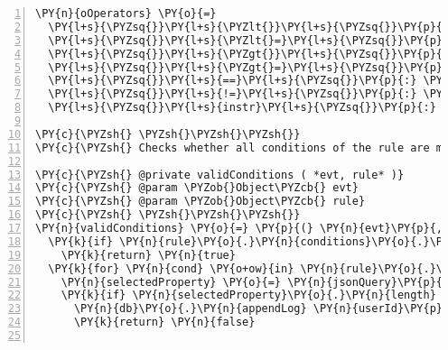 \begin{Verbatim}[fontsize=\scriptsize,commandchars=\\\{\},numbers=left,firstnumber=1,stepnumber=1]
\PY{n}{oOperators} \PY{o}{=}
  \PY{l+s}{\PYZsq{}}\PY{l+s}{\PYZlt{}}\PY{l+s}{\PYZsq{}}\PY{p}{:} \PY{p}{(} \PY{n}{x}\PY{p}{,} \PY{n}{y} \PY{p}{)} \PY{o}{\PYZhy{}}\PY{o}{\PYZgt{}} \PY{n}{x} \PY{o}{\PYZlt{}} \PY{n}{y}
  \PY{l+s}{\PYZsq{}}\PY{l+s}{\PYZlt{}=}\PY{l+s}{\PYZsq{}}\PY{p}{:} \PY{p}{(} \PY{n}{x}\PY{p}{,} \PY{n}{y} \PY{p}{)} \PY{o}{\PYZhy{}}\PY{o}{\PYZgt{}} \PY{n}{x} \PY{o}{\PYZlt{}}\PY{o}{=} \PY{n}{y}
  \PY{l+s}{\PYZsq{}}\PY{l+s}{\PYZgt{}}\PY{l+s}{\PYZsq{}}\PY{p}{:} \PY{p}{(} \PY{n}{x}\PY{p}{,} \PY{n}{y} \PY{p}{)} \PY{o}{\PYZhy{}}\PY{o}{\PYZgt{}} \PY{n}{x} \PY{o}{\PYZgt{}} \PY{n}{y}
  \PY{l+s}{\PYZsq{}}\PY{l+s}{\PYZgt{}=}\PY{l+s}{\PYZsq{}}\PY{p}{:} \PY{p}{(} \PY{n}{x}\PY{p}{,} \PY{n}{y} \PY{p}{)} \PY{o}{\PYZhy{}}\PY{o}{\PYZgt{}} \PY{n}{x} \PY{o}{\PYZgt{}}\PY{o}{=} \PY{n}{y}
  \PY{l+s}{\PYZsq{}}\PY{l+s}{==}\PY{l+s}{\PYZsq{}}\PY{p}{:} \PY{p}{(} \PY{n}{x}\PY{p}{,} \PY{n}{y} \PY{p}{)} \PY{o}{\PYZhy{}}\PY{o}{\PYZgt{}} \PY{n}{x} \PY{o+ow}{is} \PY{n}{y}
  \PY{l+s}{\PYZsq{}}\PY{l+s}{!=}\PY{l+s}{\PYZsq{}}\PY{p}{:} \PY{p}{(} \PY{n}{x}\PY{p}{,} \PY{n}{y} \PY{p}{)} \PY{o}{\PYZhy{}}\PY{o}{\PYZgt{}} \PY{n}{x} \PY{n}{isnt} \PY{n}{y}
  \PY{l+s}{\PYZsq{}}\PY{l+s}{instr}\PY{l+s}{\PYZsq{}}\PY{p}{:} \PY{p}{(} \PY{n}{x}\PY{p}{,} \PY{n}{y} \PY{p}{)} \PY{o}{\PYZhy{}}\PY{o}{\PYZgt{}} \PY{n}{x}\PY{o}{.}\PY{n}{indexOf}\PY{p}{(} \PY{n}{y} \PY{p}{)} \PY{o}{\PYZgt{}} \PY{o}{\PYZhy{}}\PY{l+m+mi}{1}

\PY{c}{\PYZsh{} \PYZsh{}\PYZsh{}\PYZsh{}}
\PY{c}{\PYZsh{} Checks whether all conditions of the rule are met by the event.}

\PY{c}{\PYZsh{} @private validConditions ( *evt, rule* )}
\PY{c}{\PYZsh{} @param \PYZob{}Object\PYZcb{} evt}
\PY{c}{\PYZsh{} @param \PYZob{}Object\PYZcb{} rule}
\PY{c}{\PYZsh{} \PYZsh{}\PYZsh{}\PYZsh{}}
\PY{n}{validConditions} \PY{o}{=} \PY{p}{(} \PY{n}{evt}\PY{p}{,} \PY{n}{rule}\PY{p}{,} \PY{n}{userId}\PY{p}{,} \PY{n}{ruleId} \PY{p}{)} \PY{o}{\PYZhy{}}\PY{o}{\PYZgt{}}
  \PY{k}{if} \PY{n}{rule}\PY{o}{.}\PY{n}{conditions}\PY{o}{.}\PY{n}{length} \PY{o+ow}{is} \PY{l+m+mi}{0}
    \PY{k}{return} \PY{n}{true}
  \PY{k}{for} \PY{n}{cond} \PY{o+ow}{in} \PY{n}{rule}\PY{o}{.}\PY{n}{conditions}
    \PY{n}{selectedProperty} \PY{o}{=} \PY{n}{jsonQuery}\PY{p}{(} \PY{n}{evt}\PY{p}{,} \PY{n}{cond}\PY{o}{.}\PY{n}{selector} \PY{p}{)}\PY{o}{.}\PY{n}{nodes}\PY{p}{(}\PY{p}{)}
    \PY{k}{if} \PY{n}{selectedProperty}\PY{o}{.}\PY{n}{length} \PY{o+ow}{is} \PY{l+m+mi}{0}
      \PY{n}{db}\PY{o}{.}\PY{n}{appendLog} \PY{n}{userId}\PY{p}{,} \PY{n}{ruleId}\PY{p}{,} \PY{l+s}{\PYZsq{}}\PY{l+s}{Condition}\PY{l+s}{\PYZsq{}}\PY{p}{,} \PY{l+s}{\PYZdq{}}\PY{l+s}{Node not found in event: \PYZsh{}\PYZob{} cond.selector \PYZcb{}}\PY{l+s}{\PYZdq{}}
      \PY{k}{return} \PY{n}{false} 


\end{Verbatim}
